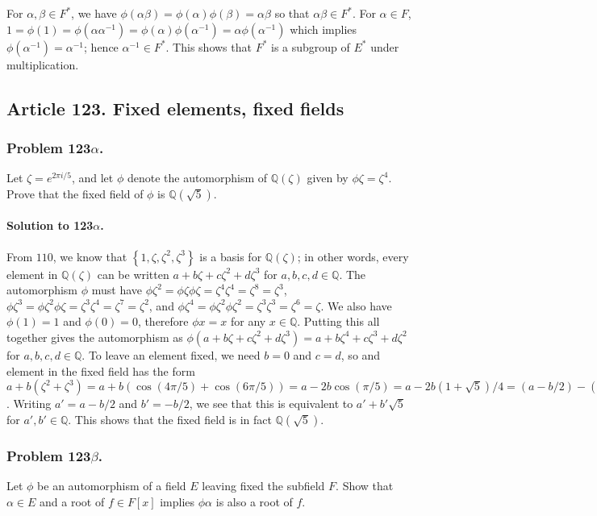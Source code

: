 For $\alpha, \beta \in F^*$, we have
$\phi (\alpha \beta) = \phi(\alpha) \phi(\beta) = \alpha \beta$ so that
$\alpha \beta \in F^*$. For $\alpha \in F$, $1 = \phi(1) = \phi (\alpha \alpha^{-1}) =
\phi(\alpha) \phi(\alpha^{-1}) = \alpha \phi(\alpha^{-1})$ which implies
$\phi(\alpha^{-1}) = \alpha^{-1}$; hence $\alpha^{-1} \in F^*$. This shows that $F^*$ is a
subgroup of $E^*$ under multiplication.
\subsection{Article 123. Fixed elements, fixed fields}
\subsubsection{Problem 123$\alpha$.}
Let $\zeta = e^{2\pi i/5}$, and let $\phi$ denote the automorphism of
$\mathbb{Q}(\zeta)$ given by $\phi \zeta = \zeta^4$. Prove that the fixed
field of $\phi$ is $\mathbb{Q}(\sqrt{5})$.

\paragraph*{Solution to 123$\alpha$.}
From $110$, we know that $\left\{1, \zeta, \zeta^2, \zeta^3 \right\}$
is a basis for $\mathbb{Q}(\zeta)$; in other words, every element in $\mathbb{Q}(\zeta)$
can be written $a + b\zeta + c\zeta^2 + d\zeta^3$ for $a, b,c,d \in \mathbb{Q}$.
The automorphism $\phi$ must have $\phi\zeta^2 = \phi\zeta \phi\zeta = \zeta^4 \zeta^4
= \zeta^8 = \zeta^3$, $\phi\zeta^3 = \phi\zeta^2 \phi\zeta = \zeta^3 \zeta^4
= \zeta^7 = \zeta^2$, and $\phi\zeta^4 = \phi\zeta^2 \phi\zeta^2 = \zeta^3 \zeta^3
= \zeta^6 = \zeta$. We also have $\phi(1) = 1$ and $\phi(0) = 0$, therefore
$\phi x = x$ for any $x \in \mathbb{Q}$. Putting this all together gives the
automorphism as $\phi(a+b\zeta+c\zeta^2+d\zeta^3)=a+b\zeta^4+c\zeta^3+d\zeta^2$
for $a,b,c,d \in \mathbb{Q}$. To leave an element fixed, we need $b=0$ and $c=d$,
so and element in the fixed field has the form $a + b(\zeta^2 +\zeta^3) =
a + b(\cos(4\pi/5)+\cos(6\pi/5)) = a - 2b\cos(\pi/5) = a - 2b(1+\sqrt{5})/4 =
(a-b/2) - (b\sqrt{5}/2)$. Writing $a' = a - b/2$ and $b' = -b/2$, we see that this
is equivalent to $a' + b'\sqrt{5}$ for $a',b' \in \mathbb{Q}$. This shows that
the fixed field is in fact $\mathbb{Q}(\sqrt{5})$.

\subsubsection{Problem 123$\beta$.}
Let $\phi$ be an automorphism of a field $E$ leaving fixed the subfield $F$.
Show that $\alpha \in E$ and a root of $f \in F[x]$ implies $\phi\alpha$ is also
a root of $f$.

